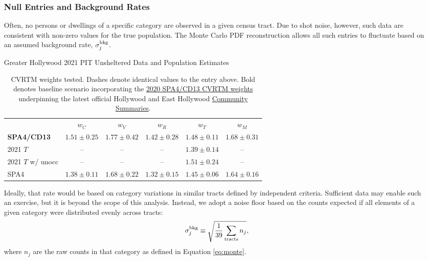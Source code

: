 \documentclass[11pt,twocolumn]{article}
\begin{document}
\subsubsection{Null Entries and Background Rates}
\label{sec:nulls}

Often, no persons or dwellings of a specific category are observed in a given census tract. Due to shot 
noise, however, such data are consistent with non-zero values for the true population. The Monte Carlo 
PDF reconstruction allows all such entries to fluctuate based on an assumed background rate,
$\sigma_{j}^{\rm bkg}$. 

\begin{table}[t]
\centering
\caption{Greater Hollywood 2021 PIT Unsheltered Data and Population Estimates}
\begin{tabular}{lccccc}
\toprule
 & $w_{C}$ & $w_{V}$ & $w_{R}$ & $w_{T}$ & $w_{M}$ \\ \cmidrule{1-6}
{\bf SPA4/CD13} & $1.51\pm0.25$ & $1.77\pm0.42$ & $1.42\pm0.28$ & $1.48\pm0.11$ & $1.68\pm0.31$ \\
2021 $T$ & -- & -- & -- & $1.39\pm0.14$ & --\\
2021 $T$ w/ unocc & -- & -- & --& $1.51\pm0.24$ & --\\
SPA4 & $1.38\pm0.11$ & $1.68\pm0.22$ & $1.32\pm0.15$ & $1.45\pm0.06$ & $1.64\pm0.16$\\
\bottomrule
\end{tabular}
\caption*{CVRTM weights tested. Dashes denote identical values to the entry above. Bold denotes 
baseline scenario incorporating the 
\href{https://www.lahsa.org/documents?id=4635-usc-2018-2020-multipliers-and-estimates-overview}
{2020 SPA4/CD13 CVRTM weights} underpinning the latest official Hollywood and East Hollywood 
\href{https://www.lahsa.org/documents?id=4686-2020-greater-los-angeles-city-community-homelessness-report-service-planning-area-4.pdf}{Community Summaries}.}
\label{tbl:weights}
\end{table}

Ideally, that rate would be based on category variations in similar tracts defined by independent 
criteria. Sufficient data may enable such an exercise, but it is beyond the scope of this analysis. 
Instead, we adopt a noise floor based on the counts expected if all elements of a given category
were distributed evenly across tracts:
\begin{equation}
	\sigma_{j}^{\rm bkg} \equiv \sqrt{\frac{1}{39}\sum_{\rm tracts}n_{j}},
\end{equation}
where $n_{j}$ are the raw counts in that category as defined in Equation \ref{eq:monte}.
\end{document}
